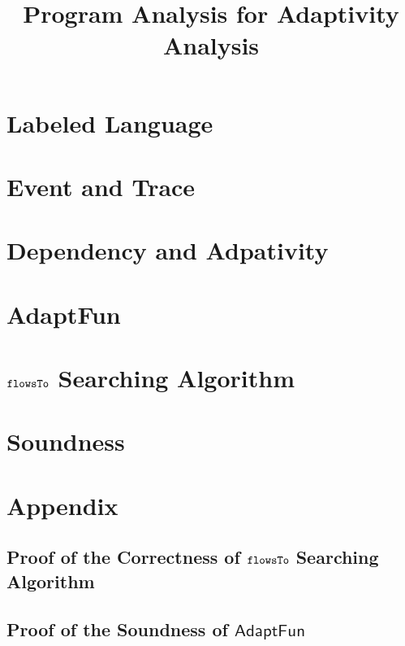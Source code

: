 \documentclass[a4paper,11pt]{article}
\newcommand{\THESYSTEM}{\textsf{AdaptFun}}
\begin{document}
\title{Program Analysis for Adaptivity Analysis}

\author{}

\date{}

\maketitle
%
% 
\section{Labeled Language}

\clearpage
\section{Event and Trace}


\clearpage
\section{Dependency and Adpativity}


% 
\clearpage
\section{\THESYSTEM}


\clearpage
\section{$\mathtt{flowsTo}$ Searching Algorithm}


\section{Soundness}

\clearpage
%
\section*{Appendix}
\subsection{Proof of the Correctness of $\mathtt{flowsTo}$ Searching Algorithm}

\subsection{Proof of the Soundness of $\THESYSTEM$}




\end{document}
